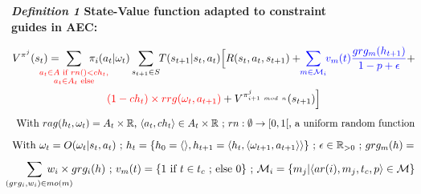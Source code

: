 \documentclass[pdflatex,sn-mathphys-num]{sn-jnl}%
\theoremstyle{thmstyleone}%
\theoremstyle{thmstyletwo}%
\theoremstyle{thmstylethree}%
\begin{document}
\begin{figure}[h!]
    \label{eq:single_value_function}
    \raggedright
    \textbf{\textit{Definition 1} \quad State-Value function adapted to constraint guides in AEC:}
    
    \begin{scriptsize}
        \vspace{-0.6cm}
        \begin{gather*}
            V^{\pi^j}(s_t) = \hspace{-0.75cm}
            \sum_{\textcolor{red}{ \substack{a_{t} \in A \text{ if } rn() < ch_{t}, \\
                        a_{t} \in A_{t} \text{ else}}
                }}{\hspace{-0.7cm} \pi_i(a_{t} | \omega_t)}
            \sum_{s_{t+1} \in S}
            {\hspace{-0.1cm} T(s_{t+1} | s_t, a_{t})
            \Bigl[R(s_t,a_{t},s_{t+1}) + \hspace{-0.1cm}
            \textcolor{blue}{ \sum_{m \in \mathcal{M}_i}{ \hspace{-0.1cm} v_m(t) \frac{grg_m(h_{t+1})}{1 - p + \epsilon} } }
            + } \\
            {\textcolor{red}{(1-ch_t) \times rrg(\omega_t,a_{t+1})} + V^{\pi^j_{i+1 \ mod \ n}}(s_{t+1})\Bigr]}
        \end{gather*}
        \vspace{-0.5cm}
        \textcolor{red}{\[\text{ \hspace{-0.1cm} With } rag(h_t, \omega_t) = A_{t} \times \mathbb{R} \text{, } \langle a_t, ch_{t} \rangle \in A_{t} \times \mathbb{R} \text{ ; } rn: \emptyset \to [0,1[ \text{, a uniform random function}\]}
        \vspace{-0.6cm}
        \textcolor{blue}{
            \begin{gather*}
                \hspace{-0.001cm}
                \text{With } \omega_t = O(\omega_t | s_t, a_t) \text{ ; } h_t = \{h_0 = \langle \rangle, h_{t+1} = \langle h_t, \langle \omega_{t+1}, a_{t+1} \rangle \rangle \} \text{ ; } \epsilon \in \mathbb{R}_{>0} \text{ ; } grg_m(h) = 
            \end{gather*}
        }
        \vspace{-0.95cm}
        \textcolor{blue}{
            \begin{gather*}
                \hspace{-0.5cm} \sum_{\hspace{0.3cm}(grg_i,w_i) \in mo(m)}{\hspace{-0.9cm} w_i \times grg_i(h)}
                \text{ ; } v_m(t) = \{ 1 \text{ if } t \in t_c \text{ ; else } 0 \} \text{ ; } \mathcal{M}_i = \{m_j | \langle ar(i),m_j,t_c,p \rangle \in \mathcal{M}\}
            \end{gather*}
        }
        \vspace{-0.6cm}
    \end{scriptsize}
    
\end{figure}
\end{document}
